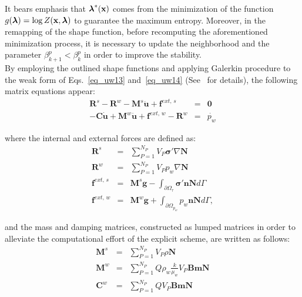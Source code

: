 \documentclass[twocolumn]{svjour3}          %
\begin{document}
It bears emphasis that $\boldsymbol{\lambda}^*(\bf x)$ comes from the minimization of the function $g(\boldsymbol{\lambda})=\log Z(\bf x, \boldsymbol{\lambda})$ to guarantee the maximum entropy. Moreover, in the remapping of the shape function, before recomputing the aforementioned minimization process, it is necessary to update the neighborhood and the parameter $\beta_{k+1}^p < \beta_{k}^p$ in order to improve the stability.\\

By employing the outlined shape functions and applying Galerkin procedure to the weak form of Eqs.~\eqref{eq_uw13} and~\eqref{eq_uw14}
 (See~\cite{Sanavia:02,Sanavia:06} for details), the following matrix equations appear:
 \begin{eqnarray}
 \boldsymbol{R}^s- \boldsymbol{R}^w- \boldsymbol{M}^s \ddot{\boldsymbol{u}} + \boldsymbol{f}^{ext, \, s} &=& \boldsymbol{0} \label{mat1}\\
- \boldsymbol{C} \dot{\boldsymbol{u}} + \boldsymbol{M}^w \ddot{\boldsymbol{u}} + \boldsymbol{f}^{ext, \, w}-\boldsymbol{R}^{w}
  \label{mat2} &=& \dot{p_w}
 \end{eqnarray}
 
 where the internal and external forces are defined as:
 \begin{eqnarray}
  \boldsymbol{R}^s &=& \sum_{P=1}^{N_{P}} V_{P} \boldsymbol{\sigma'} \nabla \mathbf{N} \nonumber \\
    \boldsymbol{R}^w &=& \sum_{P=1}^{N_{P}} V_{P} p_w \nabla \mathbf{N} \nonumber \\
  \boldsymbol{f}^{ext, \, s} &=& \boldsymbol{M}^s \boldsymbol{g} - \int_{\partial \Omega_{\tau}} \boldsymbol{\sigma'} \boldsymbol{n}\mathbf{N} d \Gamma\nonumber \\
 \boldsymbol{f}^{ext, \, w} &=& \boldsymbol{M}^w \boldsymbol{g} + \int_{\partial \Omega_{p_w}} p_w \boldsymbol{n} \mathbf{N} d \Gamma, \nonumber
  \end{eqnarray}
  
  and the mass and damping matrices, constructed as lumped matrices in order to alleviate the computational effort of the explicit scheme, are written as follows:
   \begin{eqnarray}
  \boldsymbol{M}^s &=& \sum_{P=1}^{N_{P}} V_{P} \rho \mathbf{N} \nonumber \\
    \boldsymbol{M}^w &=& \sum_{P=1}^{N_{P}} Q \rho_w \frac{k}{\mu_w} V_{P} \mathbf{B}\mathbf{m} \mathbf{N} \nonumber \\
        \boldsymbol{C}^w &=& \sum_{P=1}^{N_{P}} Q V_{P} \mathbf{B}\mathbf{m} \mathbf{N} \nonumber
  \end{eqnarray}
  
\end{document}
